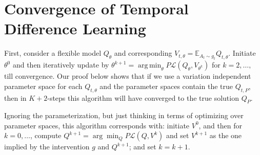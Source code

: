 \documentclass{article}
\theoremstyle{plain}
\theoremstyle{definition}
\theoremstyle{remark}
\DeclareMathOperator*{\argmin}{arg\,min}
\begin{document}


\section{Convergence of Temporal Difference Learning}

\label{sec:convergence of td}

First, consider a flexible model $Q_\theta$ and corresponding $V_{t,\theta}=\mathbb{E}_{A_t\sim g_t}Q_{t,\theta}$. Initiate $\theta^0$ and then iteratively update by $\theta^{k+1}=\argmin_{\theta}P\mathcal{L}(Q_\theta,V_{\theta^k})$ for $k=2,\ldots,$ till convergence. Our proof below shows that if we use a variation independent parameter space for each $Q_{t, \theta}$ and the parameter spaces contain the true $Q_{t,P}$, then in $K+2$-steps this algorithm will have converged to the true solution $Q_{P}$.

Ignoring the parameterization, but just thinking in terms of optimizing over parameter spaces, this algorithm corresponds with: initiate $V^0$, and then for $k=0, \ldots$, compute $Q^{k+1}=\arg \min _{Q} P \mathcal{L}\left(Q, V^k\right)$ and set $V^{k+1}$ as the one implied by the intervention $g$ and $Q^{k+1}$; and set $k=k+1$.
\end{document}
